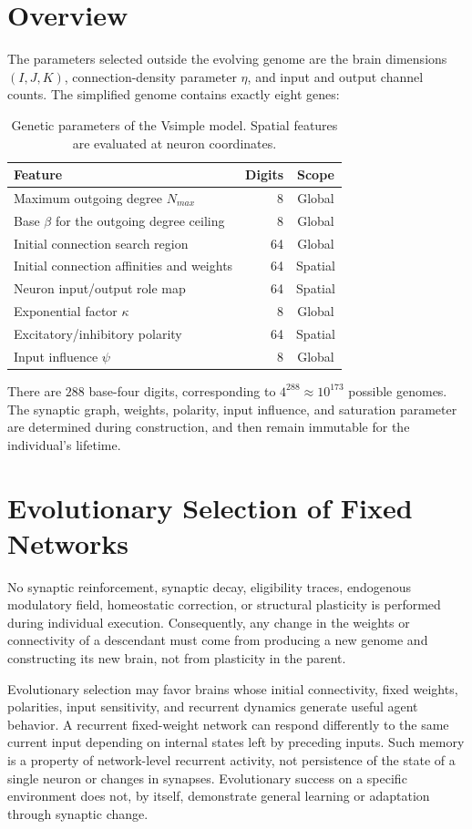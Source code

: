 \documentclass[12pt,a4paper]{article}
\begin{document}
\section{Overview}
The parameters selected outside the evolving genome are the brain dimensions $(I,J,K)$, connection-density parameter $\eta$, and input and output channel counts. The simplified genome contains exactly eight genes:
\begin{table}[H]\centering\small
\begin{tabular}{p{9cm}rc}\toprule
\textbf{Feature} & \textbf{Digits} & \textbf{Scope} \\\midrule
Maximum outgoing degree $N_{max}$ & 8 & Global \\
Base $\beta$ for the outgoing degree ceiling & 8 & Global \\
Initial connection search region & 64 & Global \\
Initial connection affinities and weights & 64 & Spatial \\
Neuron input/output role map & 64 & Spatial \\
Exponential factor $\kappa$ & 8 & Global \\
Excitatory/inhibitory polarity & 64 & Spatial \\
Input influence $\psi$ & 8 & Global \\\bottomrule
\end{tabular}
\caption{Genetic parameters of the Vsimple model. Spatial features are evaluated at neuron coordinates.}
\label{model_gens}
\end{table}
There are $288$ base-four digits, corresponding to $4^{288}\approx10^{173}$ possible genomes. The synaptic graph, weights, polarity, input influence, and saturation parameter are determined during construction, and then remain immutable for the individual's lifetime.

\section{Evolutionary Selection of Fixed Networks}
No synaptic reinforcement, synaptic decay, eligibility traces, endogenous modulatory field, homeostatic correction, or structural plasticity is performed during individual execution. Consequently, any change in the weights or connectivity of a descendant must come from producing a new genome and constructing its new brain, not from plasticity in the parent.

Evolutionary selection may favor brains whose initial connectivity, fixed weights, polarities, input sensitivity, and recurrent dynamics generate useful agent behavior. A recurrent fixed-weight network can respond differently to the same current input depending on internal states left by preceding inputs. Such memory is a property of network-level recurrent activity, not persistence of the state of a single neuron or changes in synapses. Evolutionary success on a specific environment does not, by itself, demonstrate general learning or adaptation through synaptic change.
\end{document}
